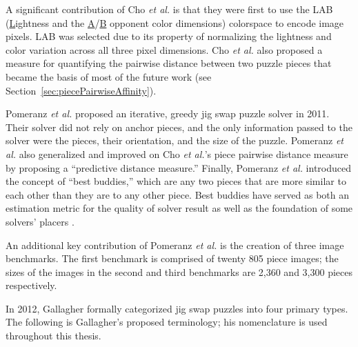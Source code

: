 \documentclass{report}
\begin{document}
A significant contribution of Cho \textit{et al.} is that they were first to use the LAB  (\underline{L}ightness and the \underline{A}/\underline{B} opponent color dimensions) colorspace to encode image pixels.  LAB was selected due to its property of normalizing the lightness and color variation across all three pixel dimensions.  Cho \textit{et al.} also proposed a measure for quantifying the pairwise distance between two puzzle pieces that became the basis of most of the future work (see Section~\ref{sec:piecePairwiseAffinity}).  

Pomeranz \textit{et al.} \cite{pomeranz2011} proposed an iterative, greedy jig swap puzzle solver in 2011.  Their solver did not rely on anchor pieces, and the only information passed to the solver were the pieces, their orientation, and the size of the puzzle.  Pomeranz \textit{et al.} also generalized and improved on Cho \textit{et al.}'s piece pairwise distance measure by proposing a ``predictive distance measure.''  Finally, Pomeranz \textit{et al.} introduced the concept of ``best buddies,'' which are any two pieces that are more similar to each other than they are to any other piece.  Best buddies have served as both an estimation metric for the quality of solver result as well as the foundation of some solvers' placers \cite{paikin2015}.

An additional key contribution of Pomeranz \textit{et al.} is the creation of three image benchmarks.  The first benchmark is comprised of twenty 805 piece images; the sizes of the images in the second and third benchmarks are 2,360 and 3,300 pieces respectively.

In 2012, Gallagher \cite{gallagher2012} formally categorized jig swap puzzles into four primary types.  The following is Gallagher's proposed terminology; his nomenclature is used throughout this thesis.
\end{document}
